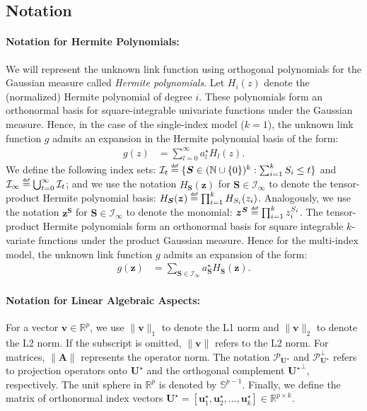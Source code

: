 \documentclass[final,12pt]{colt2018} %
\newcommand{\N}{\mathbb{N}}
\newcommand{\R}{\mathbb{R}}
\newcommand{\unitsphere}[1]{\mathbb{S}^{#1}}
\newcommand{\explain}[2]{\mathrel{\overset{\makebox[0pt]{\mbox{\normalfont\tiny\sffamily #1}}}{#2}}}
\renewcommand\v[1]{{\ensuremath{\boldsymbol{#1}}}}
\newcommand\ip[1]{\left\langle #1 \right\rangle}
\begin{document}
\subsection{Notation}
\paragraph{Notation for Hermite Polynomials:} We will represent the unknown link function using orthogonal polynomials for the Gaussian measure called {\em Hermite polynomials}. Let $H_i(z)$ denote the (normalized) Hermite polynomial of degree $i$. These polynomials form an orthonormal basis for square-integrable univariate functions under the Gaussian measure. Hence, in the case of the single-index model ($k=1$), the unknown link function $g$ admits an expansion in the Hermite polynomial basis of the form: 
\begin{align*}
    g(z) & = \sum_{l=0}^ \infty a_l^\star H_l(z).
\end{align*}
We define the following index sets: $\mathcal{I}_t \explain{def}{=} \{\v S \in (\N \cup \{0\})^k: \sum_{i=1}^k S_i \leq t \}$ and $\mathcal{I}_\infty \explain{def}{=} \bigcup_{t=0}^\infty \mathcal{I}_t$;
and we use the notation $H_{\v S}(\v z)$ for $\v S \in \mathcal{I}_\infty$ to denote the tensor-product Hermite polynomial basis: $H_{\v S}(\v z) \explain{def}{=} \prod_{i=1}^k H_{S_i}(z_i)$.
Analogously, we use the notation $\v z^{\v S}$ for ${\v S} \in \mathcal{I}_\infty$ to denote the monomial: $\v z^{\v S} \explain{def}{=} \prod_{i=1}^k z_i^{S_i}$.
The tensor-product Hermite polynomials form an orthonormal basis for square integrable $k$-variate functions under the product Gaussian measure. Hence for the multi-index model, the unknown link function $g$ admits an expansion of the form: 
\begin{align*}
    g(\v z) & = \sum_{{\v S} \in \mathcal{I}_\infty} a_{\v S}^\star H_{\v S}(\v z).
\end{align*}
\paragraph{Notation for Linear Algebraic Aspects:} For a vector $\v v \in \R^p$, we use $\| \v v \|_1$ to denote the L1 norm and $\| \v v \|_2$ to denote the L2 norm. If the subscript is omitted, $\| \v v \|$ refers to the L2 norm. For matrices, $\| \v A \|$ represents the operator norm. %
The notation $\mathcal{P}_{\mathcal{\v U}^\star}$ and $\mathcal{P}^\perp_{\mathcal{\v U}^\star}$ refers to projection operators onto $\mathcal{\v U}^\star$ and the orthogonal complement ${\mathcal{\v U}^\star}^\perp$, respectively. The unit sphere in $\R^p$ is denoted by $\unitsphere{p-1}$. Finally, we define the matrix of orthonormal index vectors $\v U^\star = [\v u_1^\star, \v u_2^\star, \dotsc, \v u_k^\star]  \in \R^{p \times k}$.
\end{document}
